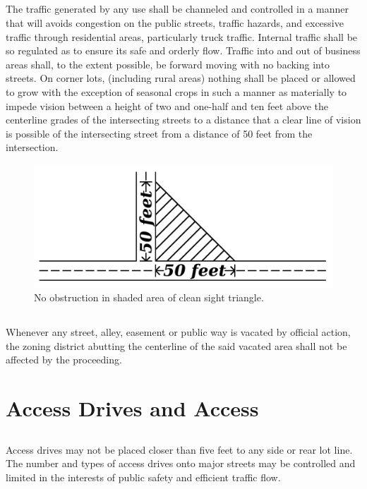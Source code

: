 \subsection{}
The traffic generated by any use shall be channeled and controlled in a manner that will avoids congestion on the public streets, traffic hazards, and excessive traffic through residential areas, particularly truck traffic. Internal traffic shall be so regulated as to ensure its safe and orderly flow. Traffic into and out of business areas shall, to the extent possible, be forward moving with no backing into streets. On corner lots, (including rural areas) nothing shall be placed or allowed to grow with the exception of seasonal crops in such a manner as materially to impede vision between a height of two and one-half and ten feet above the centerline grades of the intersecting streets to a distance that a clear line of vision is possible of the intersecting street from a distance of 50 feet from the intersection.
\begin{figure}[h]
    \centering
    \includegraphics[width=\textwidth]{./images/citycode_fig1.jpg}
    \caption{No obstruction in shaded area of clean sight triangle.}
\end{figure}
\subsection{}
Whenever any street, alley, easement or public way is vacated by official action, the zoning district abutting the centerline of the said vacated area shall not be affected by the proceeding.

\section{Access Drives and Access}
\subsection{}
Access drives may not be placed closer than five feet to any side or rear lot line.  The number and types of access drives onto major streets may be controlled and limited in the interests of public safety and efficient traffic flow.
